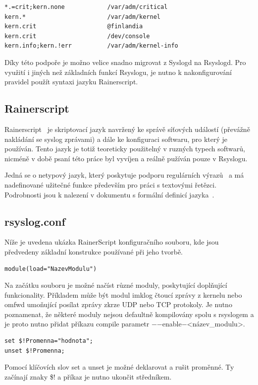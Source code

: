 \documentclass[thesis=B,czech]{FITthesis}[2012/06/26]
\begin{document}
\begin{lstlisting}[style=RainerScriptStyle]
*.=crit;kern.none            /var/adm/critical
kern.*                       /var/adm/kernel
kern.crit                    @finlandia
kern.crit                    /dev/console
kern.info;kern.!err          /var/adm/kernel-info
\end{lstlisting}

Díky této podpoře je možno velice snadno migrovat z Syslogd na Rsyslogd.
Pro využití i jiných než základních funkcí Rsyslogu, je nutno k nakonfigurování pravidel použít syntaxi jazyku Rainerscript.

\subsection{Rainerscript}
Rainerscript~\cite{RainerScript} je skriptovací jazyk navržený ke správě síťových událostí (převážně nakládání se syslog zprávami) a dále ke konfiguraci softwaru, pro který je používán.
Tento jazyk je totiž teoreticky použitelný v ruzných typech softwarů, nicméně v době psaní této práce byl vyvíjen a reálně pužíván pouze v Rsyslogu.

Jedná se o netypový jazyk, který poskytuje podporu regulárních výrazů~\cite{RainerScriptPropertyReplacer} a má nadefinované užitečné funkce především pro práci s textovými řetězci.
Podrobnosti jsou k nalezení v dokumentu s formální definicí jazyka~\cite{RainerScriptFormalDefinition}.

\subsection{rsyslog.conf}
Níže je uvedena ukázka RainerScript konfiguračního souboru, kde jsou předvedeny základní konstrukce používané při jeho tvorbě.

\begin{lstlisting}[style=RainerScriptSimpleStyle]
module(load="NazevModulu")
\end{lstlisting}
Na začátku souboru je možné načíst různé moduly, poskytující doplňující funkcionality. Příkladem může být modul imklog čtoucí zprávy z kernelu nebo omfwd umoňující posílat zprávy zkrze UDP nebo TCP protokoly. Je nutno poznamenat, že některé moduly nejsou defaultně kompilovány spolu s rsyslogem a je proto nutno přidat příkazu compile parametr $-$$-$enable$-$<název\_modulu>.

\begin{lstlisting}[style=RainerScriptSimpleStyle]
set $!Promenna="hodnota";
unset $!Promenna;
\end{lstlisting}
Pomocí klíčovích slov set a unset je možné deklarovat a rušit proměnné. Ty začínají znaky \$! a příkaz je nutno ukončit středníkem.
\end{document}
